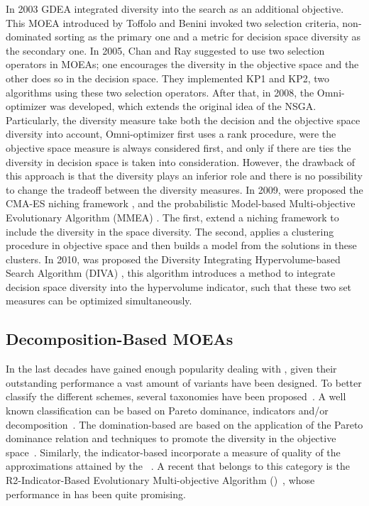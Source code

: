 In 2003 GDEA \cite{toffolo2003genetic} integrated diversity into the search as an additional objective.
%
This MOEA introduced by Toffolo and Benini invoked two selection criteria, non-dominated sorting as the primary one and a metric for decision space diversity as the secondary one.
%
In 2005, Chan and Ray \cite{chan2005evolutionary} suggested to use two selection operators in MOEAs; one encourages the diversity in the objective space and the other does so in the decision space.
%
They implemented KP1 and KP2, two algorithms using these two selection operators.
%
After that, in 2008, the Omni-optimizer \cite{deb2008omni} was developed, which extends the original idea of the NSGA. 
%
Particularly, the diversity measure take both the decision and the objective space diversity into account, Omni-optimizer first uses a rank procedure, were the objective space measure is always considered first, and only if there are ties the diversity in decision space is taken into consideration.
%
However, the drawback of this approach is that the diversity plays an inferior role and there is no possibility to change the tradeoff between the diversity measures.
%
In 2009, were proposed the  CMA-ES niching framework \cite{shir2009enhancing} , and the probabilistic Model-based Multi-objective Evolutionary Algorithm (MMEA)\cite{zhou2009approximating} .
%
The first, extend a niching framework to include the diversity in the space diversity.
%
The second, applies a clustering procedure in objective space and then builds a model from the solutions in these clusters.
%
In 2010, was proposed the Diversity Integrating Hypervolume-based Search Algorithm (DIVA) \cite{ulrich2010integrating}, this algorithm introduces a method to integrate decision space diversity into the hypervolume indicator, such that these two set measures can be optimized simultaneously.

\subsection{Decomposition-Based MOEAs}


In the last decades \MOEAS{} have gained enough popularity dealing with \MOPS{}, given their outstanding performance a vast amount of variants have been designed.
%
To better classify the different schemes, several taxonomies have been proposed~\cite{bechikh2016recent}.
%
A well known classification can be based on Pareto dominance, indicators and/or decomposition~\cite{trivedi2016survey}.
%
The domination-based \MOEAS{} are based on the application of the Pareto dominance relation and techniques to promote the diversity in the objective space~\cite{deb2002fast}.
%
Similarly, the indicator-based \MOEAS{} incorporate a measure of quality of the approximations attained by the \MOEAS{}~\cite{beume2007sms}.
%
A recent \MOEA{} that belongs to this category is the R2-Indicator-Based Evolutionary Multi-objective Algorithm (\RMOEA{})~\cite{trautmann2013r2}, whose performance in \MOPS{} has been quite promising.
%

